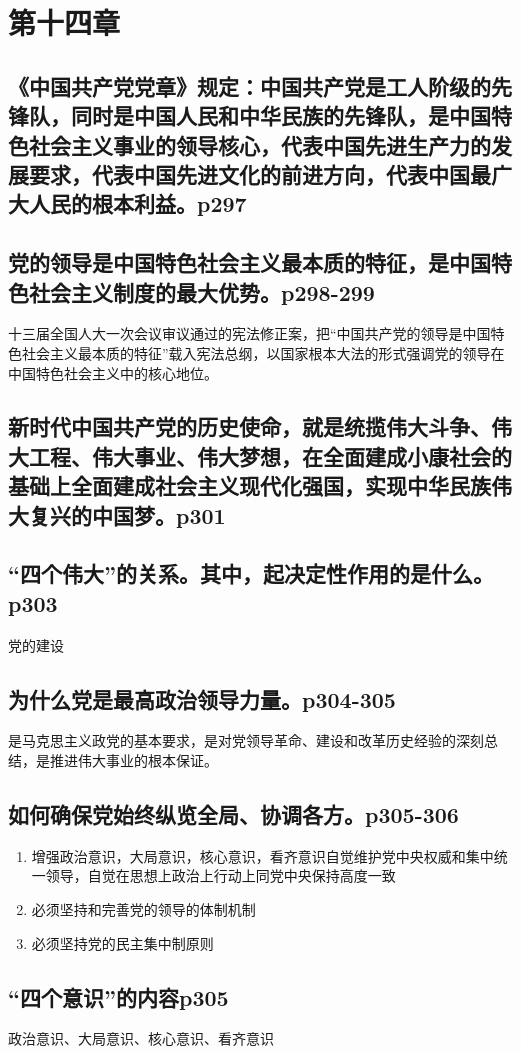 \documentclass[UTF8]{ctexart}
\begin{document}
\section{第十四章}
\subsection{《中国共产党党章》规定：中国共产党是工人阶级的先锋队，同时是中国人民和中华民族的先锋队，是中国特色社会主义事业的领导核心，代表中国先进生产力的发展要求，代表中国先进文化的前进方向，代表中国最广大人民的根本利益。p297}
\subsection{党的领导是中国特色社会主义最本质的特征，是中国特色社会主义制度的最大优势。p298-299}
十三届全国人大一次会议审议通过的宪法修正案，把“中国共产党的领导是中国特色社会主义最本质的特征”载入宪法总纲，以国家根本大法的形式强调党的领导在中国特色社会主义中的核心地位。
\subsection{新时代中国共产党的历史使命，就是统揽伟大斗争、伟大工程、伟大事业、伟大梦想，在全面建成小康社会的基础上全面建成社会主义现代化强国，实现中华民族伟大复兴的中国梦。p301}
\subsection{“四个伟大”的关系。其中，起决定性作用的是什么。p303}
党的建设
\subsection{为什么党是最高政治领导力量。p304-305}
是马克思主义政党的基本要求，是对党领导革命、建设和改革历史经验的深刻总结，是推进伟大事业的根本保证。
\subsection{如何确保党始终纵览全局、协调各方。p305-306}
\begin{enumerate}[(1)]
    \item 增强政治意识，大局意识，核心意识，看齐意识自觉维护党中央权威和集中统一领导，自觉在思想上政治上行动上同党中央保持高度一致
    \item 必须坚持和完善党的领导的体制机制
    \item 必须坚持党的民主集中制原则
    
\end{enumerate}
\subsection{“四个意识”的内容p305}
政治意识、大局意识、核心意识、看齐意识
\end{document}
